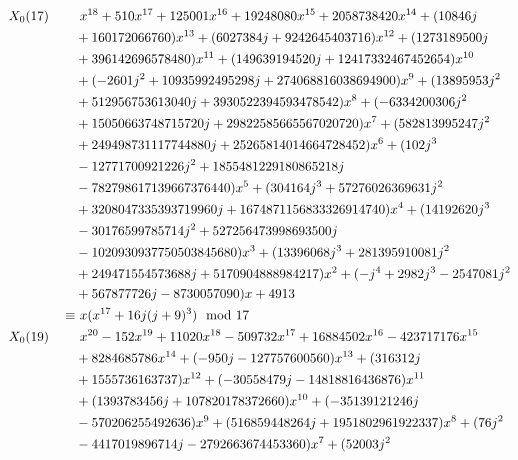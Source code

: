 \documentclass{rs}
\theoremstyle{definition}
\theoremstyle{remark}
\newcommand{\md}{~~{\rm mod}~}
\renewcommand{\=}{\approx}
\renewcommand{\-}{\sim}
\numberwithin{equation}{section}
\numberwithin{thm}{section}
\begin{document}
  \begin{equation*}
   \begin{split}
    X_0(17) \qquad & ~ x^{18}+510 x^{17}+125001 x^{16}+19248080 x^{15}+2058738420 x^{14}+(10846 j \\
                   & +160172066760) x^{13}+(6027384 j+9242645403716) x^{12}+(1273189500 j \\
                   & +396142696578480) x^{11}+(149639194520 j+12417332467452654) x^{10} \\
                   & +(-2601 j^2+10935992495298 j+274068816038694900) x^9+(13895953 j^2 \\
                   & +512956753613040 j+3930522394593478542) x^8+(-6334200306 j^2 \\
                   & +15050663748715720 j+29822585665567020720) x^7+(582813995247 j^2 \\
                   & +249498731117744880 j+25265814014664728452) x^6+(102 j^3 \\
                   & -12771700921226 j^2+1855481229180865218 j \\
                   & -782798617139667376440) x^5+(304164 j^3+57276026369631 j^2 \\
                   & +3208047335393719960 j+1674871156833326914740) x^4+(14192620 j^3 \\
                   & -30176599785714 j^2+527256473998693500 j \\
                   & -1020930937750503845680) x^3+(13396068 j^3+281395910081 j^2 \\
                   & +249471554573688 j+5170904888984217) x^2+(-j^4+2982 j^3-2547081 j^2 \\
                   & +567877726 j-8730057090) x+4913 \\
            \equiv & ~ x (x^{17} + 16 j (j + 9)^3) \md 17 \\
    X_0(19) \qquad & ~ x^{20}-152 x^{19}+11020 x^{18}-509732 x^{17}+16884502 x^{16}-423717176 x^{15} \\
                   & +8284685786 x^{14}+(-950 j-127757600560) x^{13}+(316312 j \\
                   & +1555736163737) x^{12}+(-30558479 j-14818816436876) x^{11} \\
                   & +(1393783456 j+107820178372660) x^{10}+(-35139121246 j \\
                   & -570206255492636) x^9+(516859448264 j+1951802961922337) x^8+(76 j^2 \\
                   & -4417019896714 j-2792663674453360) x^7+(52003 j^2 \\

\end{split}
\end{equation*}
\end{document}
